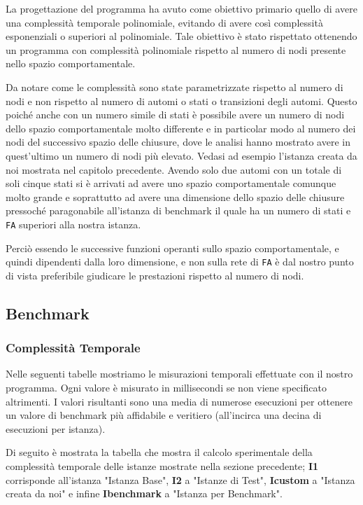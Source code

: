 La progettazione del programma ha avuto come obiettivo primario quello di avere una complessità temporale polinomiale, evitando di avere così complessità esponenziali o superiori al polinomiale. Tale obiettivo è stato rispettato ottenendo un programma con complessità polinomiale rispetto al numero di nodi presente nello spazio comportamentale. 

Da notare come le complessità sono state parametrizzate rispetto al numero di nodi e non rispetto al numero di automi o stati o transizioni degli automi. Questo poiché anche con un numero simile di stati è possibile avere un numero di nodi dello spazio comportamentale molto differente e in particolar modo al numero dei nodi del successivo spazio delle chiusure, dove le analisi hanno mostrato avere in quest'ultimo un numero di nodi più elevato. Vedasi ad esempio l'istanza creata da noi mostrata nel capitolo precedente. Avendo solo due automi con un totale di soli cinque stati si è arrivati ad avere uno spazio comportamentale comunque molto grande e soprattutto ad avere una dimensione dello spazio delle chiusure pressoché paragonabile all'istanza di benchmark il quale ha un numero di stati e \texttt{FA} superiori alla nostra istanza. 

Perciò essendo le successive funzioni operanti sullo spazio comportamentale, e quindi dipendenti dalla loro dimensione, e non sulla rete di \texttt{FA} è dal nostro punto di vista preferibile giudicare le prestazioni rispetto al numero di nodi.
\subsection{Benchmark}
\subsubsection{Complessità Temporale}
Nelle seguenti tabelle mostriamo le misurazioni temporali effettuate con il nostro programma. Ogni valore è misurato in millisecondi se non viene specificato altrimenti. 
I valori risultanti sono una media di numerose esecuzioni per ottenere un valore di benchmark più affidabile e veritiero (all'incirca una decina di esecuzioni per istanza).

Di seguito è mostrata la tabella che mostra il calcolo sperimentale della complessità temporale delle istanze mostrate nella sezione precedente; 
\textbf{I1} corrisponde all'istanza "Istanza Base", \textbf{I2} a "Istanze di Test", \textbf{Icustom} a "Istanza creata da noi" e infine \textbf{Ibenchmark} a "Istanza per Benchmark". 

